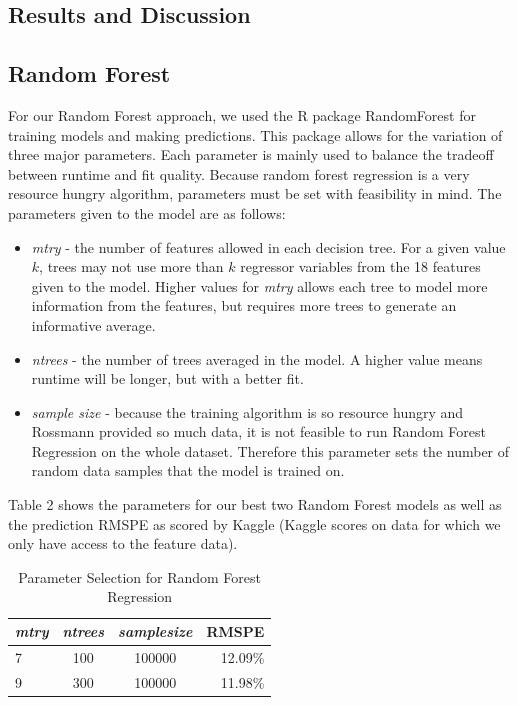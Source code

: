 \documentclass[twoside]{article}
\begin{document}
\begin{multicols}{2}
\section{Results and Discussion}

\subsection{Random Forest}

\indent \indent For our Random Forest approach, we used the R package RandomForest for training models and making predictions. This package allows for the variation of three major parameters. Each parameter is mainly used to balance the tradeoff between runtime and fit quality. Because random forest regression is a very resource hungry algorithm, parameters must be set with feasibility in mind. The parameters given to the model are as follows:
\begin{itemize}
\item \textit{mtry} - the number of features allowed in each decision tree. For a given value $k$, trees may not use more than $k$ regressor variables from the 18 features given to the model. Higher values for \textit{mtry} allows each tree to model more information from the features, but requires more trees to generate an informative average.
\item \textit{ntrees} - the number of trees averaged in the model. A higher value means runtime will be longer, but with a better fit.
\item \textit{sample size} - because the training algorithm is so resource hungry and Rossmann provided so much data, it is not feasible to run Random Forest Regression on the whole dataset. Therefore this parameter sets the number of random data samples that the model is trained on. 
\end{itemize}

Table 2 shows the parameters for our best two Random Forest models as well as the prediction RMSPE as scored by Kaggle (Kaggle scores on data for which we only have access to the feature data).

\begin{table}[H]
\caption{Parameter Selection for Random Forest Regression}
\centering
\begin{tabular}{lccr}
\toprule
\cmidrule(r){1-4}
\textit{mtry} & \textit{ntrees} & \textit{samplesize} & RMSPE\\
\midrule
7 &  100 & 100000& 12.09\% \\
9 &  300 & 100000& 11.98\%\\


\end{tabular}
\end{table}
\end{multicols}
\end{document}
